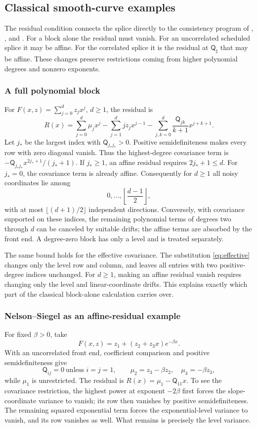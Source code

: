 \subsection{Classical smooth-curve examples}\label{app:blocks}
The residual condition connects the splice directly to the consistency program of \citet{bjork1999interest}, \citet{filipovic1999note,filipovic2000exponential}, and \citet{sharef2004conditions}. For a block alone the residual must vanish. For an uncorrelated scheduled splice it may be affine. For the correlated splice it is the residual at $\mathsf Q_\sharp$ that may be affine. These changes preserve restrictions coming from higher polynomial degrees and nonzero exponents.

\subsubsection{A full polynomial block}
For $F(x,z)=\sum_{j=0}^d z_j x^j$, $d\ge1$, the residual is
\[
R(x)=\sum_{j=0}^d \mu_j x^j-
\sum_{j=1}^d j z_j x^{j-1}
-\sum_{j,k=0}^d\frac{\mathsf Q_{jk}}{k+1}x^{j+k+1}.
\]
Let $j_*$ be the largest index with $\mathsf Q_{j_*j_*}>0$. Positive semidefiniteness makes every row with zero diagonal vanish. Thus the highest-degree covariance term is $-\mathsf Q_{j_*j_*}x^{2j_*+1}/(j_*+1)$. If $j_*\ge1$, an affine residual requires $2j_*+1\le d$. For $j_*=0$, the covariance term is already affine. Consequently for $d\ge1$ all noisy coordinates lie among
\[
0,\ldots,\left\lfloor\frac{d-1}{2}\right\rfloor,
\]
with at most $\lfloor(d+1)/2\rfloor$ independent directions. Conversely, with covariance supported on these indices, the remaining polynomial terms of degrees two through $d$ can be canceled by suitable drifts; the affine terms are absorbed by the front end. A degree-zero block has only a level and is treated separately.

The same bound holds for the effective covariance. The substitution \eqref{eq:effective} changes only the level row and column, and leaves all entries with two positive-degree indices unchanged. For $d\ge1$, making an affine residual vanish requires changing only the level and linear-coordinate drifts. This explains exactly which part of the classical block-alone calculation carries over.

\subsubsection{Nelson--Siegel as an affine-residual example}
For fixed $\beta>0$, take
\[
F(x,z)=z_1+(z_2+z_3x)e^{-\beta x}.
\]
With an uncorrelated front end, coefficient comparison and positive semidefiniteness give
\[
\mathsf Q_{ij}=0\ \text{unless }i=j=1,\qquad
\mu_2=z_3-\beta z_2,\quad \mu_3=-\beta z_3,
\]
while $\mu_1$ is unrestricted. The residual is $R(x)=\mu_1-\mathsf Q_{11}x$. To see the covariance restriction, the highest power at exponent $-2\beta$ first forces the slope-coordinate variance to vanish; its row then vanishes by positive semidefiniteness. The remaining squared exponential term forces the exponential-level variance to vanish, and its row vanishes as well. What remains is precisely the level variance.

